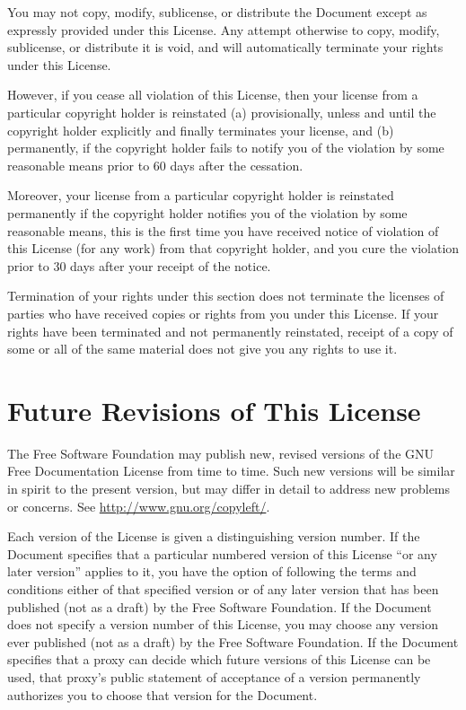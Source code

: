 You may not copy, modify, sublicense, or distribute the Document
except as expressly provided under this License.  Any attempt
otherwise to copy, modify, sublicense, or distribute it is void, and
will automatically terminate your rights under this License.

However, if you cease all violation of this License, then your license
from a particular copyright holder is reinstated (a) provisionally,
unless and until the copyright holder explicitly and finally
terminates your license, and (b) permanently, if the copyright holder
fails to notify you of the violation by some reasonable means prior to
60 days after the cessation.

Moreover, your license from a particular copyright holder is
reinstated permanently if the copyright holder notifies you of the
violation by some reasonable means, this is the first time you have
received notice of violation of this License (for any work) from that
copyright holder, and you cure the violation prior to 30 days after
your receipt of the notice.

Termination of your rights under this section does not terminate the
licenses of parties who have received copies or rights from you under
this License.  If your rights have been terminated and not permanently
reinstated, receipt of a copy of some or all of the same material does
not give you any rights to use it.

\section{Future Revisions of This License}


The Free Software Foundation may publish new, revised versions
of the GNU Free Documentation License from time to time.  Such new
versions will be similar in spirit to the present version, but may
differ in detail to address new problems or concerns.  See
\url{http://www.gnu.org/copyleft/}.

Each version of the License is given a distinguishing version number.
If the Document specifies that a particular numbered version of this
License ``or any later version'' applies to it, you have the option of
following the terms and conditions either of that specified version or
of any later version that has been published (not as a draft) by the
Free Software Foundation.  If the Document does not specify a version
number of this License, you may choose any version ever published (not
as a draft) by the Free Software Foundation.  If the Document
specifies that a proxy can decide which future versions of this
License can be used, that proxy's public statement of acceptance of a
version permanently authorizes you to choose that version for the
Document.


